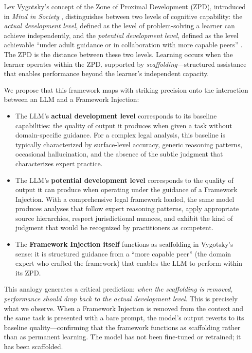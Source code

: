 \documentclass[12pt,a4paper]{article}
\begin{document}
Lev Vygotsky's concept of the Zone of Proximal Development (ZPD), introduced in \emph{Mind in Society} \citep{vygotsky1978mind}, distinguishes between two levels of cognitive capability: the \emph{actual development level}, defined as the level of problem-solving a learner can achieve independently, and the \emph{potential development level}, defined as the level achievable ``under adult guidance or in collaboration with more capable peers'' \citep[p.~86]{vygotsky1978mind}. The ZPD is the distance between these two levels. Learning occurs when the learner operates within the ZPD, supported by \emph{scaffolding}---structured assistance that enables performance beyond the learner's independent capacity.

We propose that this framework maps with striking precision onto the interaction between an LLM and a Framework Injection:

\begin{itemize}
    \item The LLM's \textbf{actual development level} corresponds to its baseline capabilities: the quality of output it produces when given a task without domain-specific guidance. For a complex legal analysis, this baseline is typically characterized by surface-level accuracy, generic reasoning patterns, occasional hallucination, and the absence of the subtle judgment that characterizes expert practice.

    \item The LLM's \textbf{potential development level} corresponds to the quality of output it can produce when operating under the guidance of a Framework Injection. With a comprehensive legal framework loaded, the same model produces analyses that follow expert reasoning patterns, apply appropriate source hierarchies, respect jurisdictional nuances, and exhibit the kind of judgment that would be recognized by practitioners as competent.

    \item The \textbf{Framework Injection itself} functions as scaffolding in Vygotsky's sense: it is structured guidance from a ``more capable peer'' (the domain expert who crafted the framework) that enables the LLM to perform within its ZPD.
\end{itemize}

This analogy generates a critical prediction: \emph{when the scaffolding is removed, performance should drop back to the actual development level}. This is precisely what we observe. When a Framework Injection is removed from the context and the same task is presented with a bare prompt, the model's output reverts to its baseline quality---confirming that the framework functions as scaffolding rather than as permanent learning. The model has not been fine-tuned or retrained; it has been scaffolded.
\end{document}
